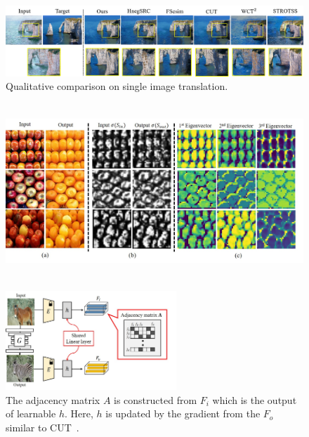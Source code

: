 \documentclass[letterpaper]{article} %
\begin{document}
\begin{figure}[!t]
\centering
\includegraphics[width=0.9\linewidth]{figs/single2.png}
\caption{Qualitative comparison on single image translation.}
\label{fig:single}
\end{figure}







\begin{figure}[t]
\centering
\includegraphics[width=0.765\linewidth,height=2.59in ]{figs/analy_21.jpg}
\label{fig:analy}
\end{figure}

\begin{figure}[!t]
\centering
\includegraphics[width=0.765\linewidth,height=1.47in ]{figs/adj_FC_h.jpg}
\caption{The adjacency matrix $A$ is constructed from $F_i$ which is the output of learnable $h$. Here, $h$ is updated by the gradient from the $F_o$ similar to CUT~\cite{cut}. }
\label{fig:adj_FC}
\end{figure}
\end{document}
